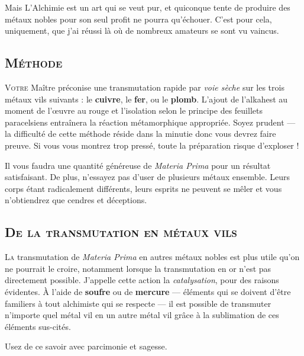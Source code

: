 Mais L'Alchimie est un art qui se veut pur, et quiconque tente de produire
des métaux nobles pour son seul profit ne pourra qu'échouer. C'est pour cela,
uniquement, que j'ai réussi là où de nombreux amateurs se sont vu vaincus.

\subsection{\textsc{Méthode}}

\lettrine{V}{otre} Maître préconise une transmutation rapide par \emph{voie sèche} sur
les trois métaux vils suivants : le \textbf{cuivre}, le \textbf{fer}, ou le
\textbf{plomb}. L'ajout de l'alkahest au moment de l'œuvre au rouge et
l'isolation selon le principe des feuillets paracelsiens entraînera la réaction
métamorphique appropriée. Soyez prudent — la difficulté de cette méthode réside dans la
minutie donc vous devrez faire preuve. Si vous vous montrez trop pressé, toute
la préparation risque d'exploser !

Il vous faudra une quantité généreuse de \emph{Materia Prima} pour un résultat
satisfaisant. De plus, n'essayez pas d'user de plusieurs métaux ensemble. Leurs
corps étant radicalement différents, leurs esprits ne peuvent se mêler et vous
n'obtiendrez que cendres et déceptions.

\subsection{\textsc{De la transmutation en métaux vils}}

\lettrine{L}{a} transmutation de \emph{Materia Prima} en autres métaux nobles
est plus utile qu'on ne pourrait le croire, notamment lorsque la transmutation
en or n'est pas directement possible. J'appelle cette action la
\emph{catalysation}, pour des raisons évidentes. À l'aide de \textbf{soufre} ou
de \textbf{mercure} — éléments qui se doivent d'être familiers à tout alchimiste
qui se respecte — il est possible de transmuter n'importe quel métal vil en un
autre métal vil grâce à la sublimation de ces éléments sus-cités.


Usez de ce savoir avec parcimonie et sagesse.

\section{}


